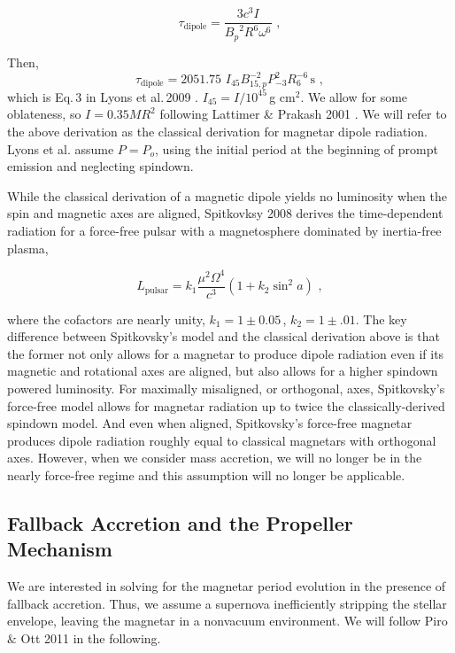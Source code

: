 \documentclass{article}
\begin{document}
\begin{equation}\tau_{\mathrm{dipole}} = \frac{3c^3 I}{{B_p}^2 R^6 \omega^6}\,\,,
\end{equation}

Then, \begin{equation}\tau_{\mathrm{dipole}} = 2051.75\,\, I_{45} B^{-2}_{15,p} P^2_{-3} R_6^{-6}\,\mathrm{s}\,\,,\end{equation}  which is Eq.\,3 in Lyons et al.\,2009 \cite{Lyons:2009ka}. $I_{45}=I/10^{45}$\,g cm$^2$. We allow for some oblateness, so $I= 0.35 M R^2$ following Lattimer \& Prakash 2001 \cite{Lattimer:2001ap}. We will refer to the above derivation as the classical derivation for magnetar dipole radiation.
Lyons et al. assume $P=P_o$, using the initial period at the beginning of prompt emission and neglecting spindown.

While the classical derivation of a magnetic dipole yields no luminosity when the spin and magnetic axes are aligned, Spitkovksy 2008 \cite{Spitkovsky:2006np} derives the time-dependent radiation for a force-free pulsar with a magnetosphere dominated by inertia-free plasma,

\begin{equation}
L_{\mathrm{pulsar}}=k_1 \frac{\mu^2 \Omega^4}{c^3}(1+k_2 \sin^2{a})\,\,,
\end{equation}

where the cofactors are nearly unity, $k_1=1\pm 0.05$\,, $k_2=1\pm .01$. The key difference between Spitkovsky's model and the classical derivation above is that the former not only allows for a magnetar to produce dipole radiation even if its magnetic and rotational axes are aligned, but also allows for a higher spindown powered luminosity. For maximally misaligned, or orthogonal, axes, Spitkovsky's force-free model allows for magnetar radiation up to twice the classically-derived spindown model. And even when aligned, Spitkovsky's force-free magnetar produces dipole radiation roughly equal to classical magnetars with orthogonal axes.  However, when we consider mass accretion, we will no longer be in the nearly force-free regime and this assumption will no longer be applicable.

\subsection{Fallback Accretion and the Propeller Mechanism} \label{sec:fallback}

We are interested in solving for the magnetar period evolution in the presence of fallback accretion. Thus, we assume a supernova inefficiently stripping the stellar envelope, leaving the magnetar in a nonvacuum environment.  We will follow Piro $\&$ Ott 2011 \cite{Piro:2011ed} in the following. \smallskip
\end{document}
